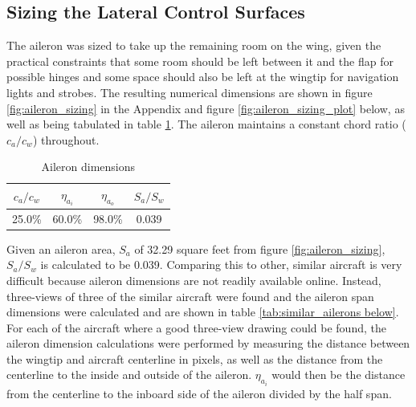 \documentclass[conf]{new-aiaa}
\begin{document}
\subsection{Sizing the Lateral Control Surfaces}

The aileron was sized to take up the remaining room on the wing, given the practical constraints that some room should be left between it and the flap for possible hinges and some space should also be left at the wingtip for navigation lights and strobes. The resulting numerical dimensions are shown in figure \ref{fig:aileron_sizing} in the Appendix and figure \ref{fig:aileron_sizing_plot} below, as well as being tabulated in table \ref{tab:aileron_size_table}. The aileron maintains a constant chord ratio ($c_a/c_w$) throughout.

\begin{table}[H]
\centering
\caption{Aileron dimensions}
\begin{tabular}{|c|c|c|c|}\hline
    $c_a/c_w$ & $\eta_{a_i}$ & $\eta_{a_o}$ & $S_a/S_w$ \\ \hline
    25.0\%    & 60.0\%     & 98.0\%     & 0.039     \\ \hline
\end{tabular}
\label{tab:aileron_size_table}
\end{table}

Given an aileron area, $S_a$ of 32.29 square feet from figure \ref{fig:aileron_sizing}, $S_a/S_w$ is calculated to be 0.039. Comparing this to other, similar aircraft is very difficult because aileron dimensions are not readily available online. Instead, three-views of three of the similar aircraft were found and the aileron span dimensions were calculated and are shown in table \ref{tab:similar_ailerons below}. For each of the aircraft where a good three-view drawing could be found, the aileron dimension calculations were performed by measuring the distance between the wingtip and aircraft centerline in pixels, as well as the distance from the centerline to the inside and outside of the aileron. $\eta_{a_i}$ would then be the distance from the centerline to the inboard side of the aileron divided by the half span.
\end{document}
